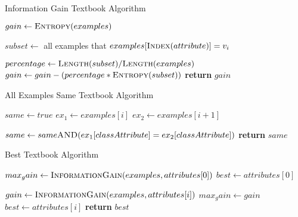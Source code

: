 \begin{algorithm}[H]
\caption{Information Gain Textbook Algorithm}\label{a:id3-gain-simple}
\begin{algorithmic}[1]
    \State $gain \gets \textsc{Entropy}(examples)$
    
        \State $subset \gets$ all examples that $examples[\textsc{Index}(attribute)] = v_i$
        
        \State $percentage \gets \textsc{Length}(subset) / \textsc{Length}(examples)$
            \State $gain \gets gain - (percentage * \textsc{Entropy}(subset))$
        \EndIf
    \EndFor
    \State \textbf{return} $gain$
\EndProcedure
\end{algorithmic}
\end{algorithm}


\begin{algorithm}[H]
\caption{All Examples Same Textbook Algorithm}\label{a:id3-same-simple}
\begin{algorithmic}[1]
    \State $same \gets true$
        \State $ex_1 \gets examples[i]$
        \State $ex_2 \gets examples[i+1]$
        
        \State $same \gets same \textsc{AND} (ex_1[classAttribute] = ex_2[classAttribute])$
    \EndFor
    \State \textbf{return} $same$
\EndProcedure
\end{algorithmic}
\end{algorithm}


\begin{algorithm}[H]
\caption{Best Textbook Algorithm}\label{a:id3-best-simple}
\begin{algorithmic}[1]
    \State $max_gain \gets \textsc{InformationGain}(examples, attributes[0])$
    \State $best \gets attributes[0]$
    
        \State $gain \gets  \textsc{InformationGain}(examples, attributes[i])$
            \State $max_gain \gets gain$
            \State $best \gets attributes[i]$
        \EndIf
    \EndFor
    \State \textbf{return} $best$
\EndProcedure

\end{algorithmic}
\end{algorithm}

